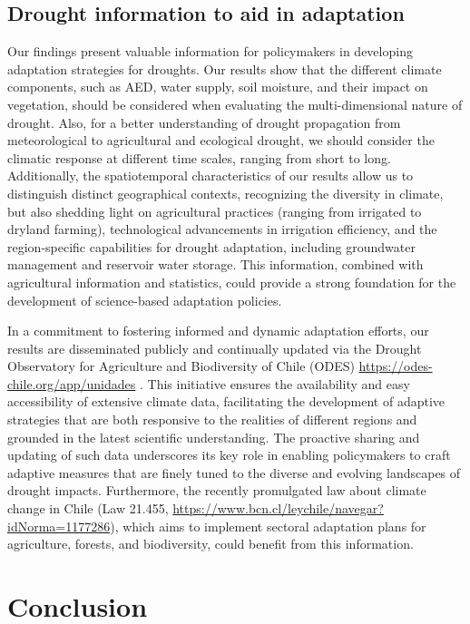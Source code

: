 \documentclass[
  authoryear,
  preprint,
  3p,
  onecolumn]{elsarticle}
\begin{document}
\subsection{Drought information to aid in
adaptation}\label{drought-information-to-aid-in-adaptation}

Our findings present valuable information for policymakers in developing
adaptation strategies for droughts. Our results show that the different
climate components, such as AED, water supply, soil moisture, and their
impact on vegetation, should be considered when evaluating the
multi-dimensional nature of drought. Also, for a better understanding of
drought propagation \citep{VanLoon2012} from meteorological to
agricultural and ecological drought, we should consider the climatic
response at different time scales, ranging from short to long.
Additionally, the spatiotemporal characteristics of our results allow us
to distinguish distinct geographical contexts, recognizing the diversity
in climate, but also shedding light on agricultural practices (ranging
from irrigated to dryland farming), technological advancements in
irrigation efficiency, and the region-specific capabilities for drought
adaptation, including groundwater management and reservoir water
storage. This information, combined with agricultural information and
statistics, could provide a strong foundation for the development of
science-based adaptation policies.

In a commitment to fostering informed and dynamic adaptation efforts,
our results are disseminated publicly and continually updated via the
Drought Observatory for Agriculture and Biodiversity of Chile (ODES)
\url{https://odes-chile.org/app/unidades}
\citep{Zambrano2023b, Kunst2023}. This initiative ensures the
availability and easy accessibility of extensive climate data,
facilitating the development of adaptive strategies that are both
responsive to the realities of different regions and grounded in the
latest scientific understanding. The proactive sharing and updating of
such data underscores its key role in enabling policymakers to craft
adaptive measures that are finely tuned to the diverse and evolving
landscapes of drought impacts. Furthermore, the recently promulgated law
about climate change in Chile (Law 21.455,
\url{https://www.bcn.cl/leychile/navegar?idNorma=1177286}), which aims
to implement sectoral adaptation plans for agriculture, forests, and
biodiversity, could benefit from this information.

\section{Conclusion}\label{conclusion}
\end{document}
